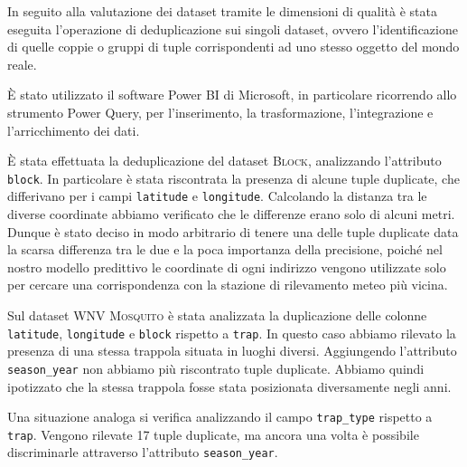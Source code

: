 In seguito alla valutazione dei dataset tramite le dimensioni di qualità è 
stata eseguita l'operazione di deduplicazione sui singoli dataset, ovvero 
l'identificazione di quelle coppie o gruppi di tuple corrispondenti ad uno 
stesso oggetto del mondo reale.

È stato utilizzato il software Power BI di Microsoft, 
in particolare ricorrendo allo strumento Power Query, per l'inserimento, la 
trasformazione, l'integrazione e l'arricchimento dei dati.

È stata effettuata la deduplicazione del dataset \textsc{Block}, 
analizzando l'attributo \texttt{block}. In particolare è stata riscontrata 
la presenza di alcune tuple duplicate, che differivano per i campi 
\texttt{latitude} e \texttt{longitude}. Calcolando la distanza tra le diverse 
coordinate abbiamo verificato che le differenze erano solo di alcuni metri.
Dunque è stato deciso in modo arbitrario di tenere una delle tuple duplicate 
data la scarsa differenza tra le due e la poca importanza della precisione, 
poiché nel nostro modello predittivo le coordinate di ogni indirizzo vengono 
utilizzate solo per cercare una corrispondenza con la stazione di rilevamento 
meteo più vicina.

Sul dataset \textsc{WNV Mosquito} è stata analizzata la duplicazione 
delle colonne \texttt{latitude}, \texttt{longitude} e \texttt{block} rispetto a 
\texttt{trap}. In questo caso abbiamo rilevato la presenza di una stessa 
trappola situata in luoghi diversi. Aggiungendo l'attributo 
\texttt{season\_year} non abbiamo più riscontrato tuple duplicate. Abbiamo 
quindi ipotizzato che la stessa trappola fosse stata posizionata diversamente 
negli anni.

Una situazione analoga si verifica analizzando il campo \texttt{trap\_type} 
rispetto a \texttt{trap}. Vengono rilevate 17 tuple duplicate, ma ancora una 
volta è possibile discriminarle attraverso l'attributo \texttt{season\_year}.

